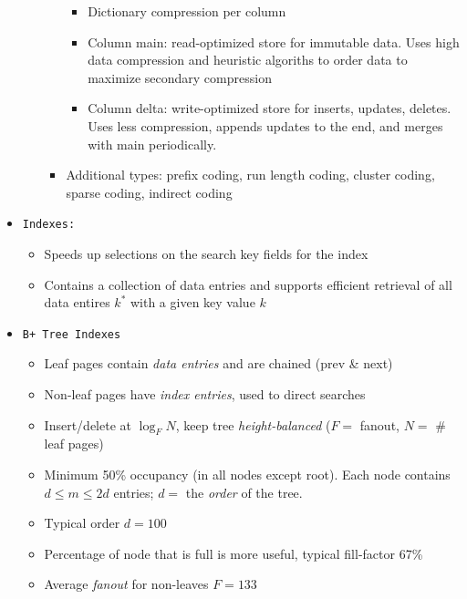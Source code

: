 \documentclass[landscape,8pt]{extarticle}
\newcommand{\code}{\lstinline}
\begin{document}
\begin{multicols}{4}
\begin{itemize}
\begin{itemize}
\begin{itemize}
\begin{itemize}
                                      \item Dictionary compression per column
                                      \item Column main: read-optimized store for immutable data. Uses high data compression and heuristic algoriths to order data to maximize secondary compression
                                      \item Column delta: write-optimized store for inserts, updates, deletes. Uses less compression, appends updates to the end, and merges with main periodically.
                                  \end{itemize}
                            \item Additional types: prefix coding, run length coding, cluster coding, sparse coding, indirect coding
                        \end{itemize}
              \end{itemize}
        \item \code{Indexes:}
              \begin{itemize}
                  \item Speeds up selections on the search key fields for the index
                  \item Contains a collection of data entries and supports efficient retrieval of all data entires $k^*$ with a given key value $k$
              \end{itemize}
        \item \code{B+ Tree Indexes}
              \begin{itemize}
                  \item Leaf pages contain \emph{data entries} and are chained (prev \& next)
                  \item Non-leaf pages have \emph{index entries}, used to direct searches
                  \item Insert/delete at $\log_F N$, keep tree \emph{height-balanced} ($F = $ fanout, $N = $ \# leaf pages)
                  \item Minimum 50\% occupancy (in all nodes except root). Each node contains $d \leq m \leq 2d$ entries; $d = $ the \emph{order} of the tree.
                  \item Typical order $d = 100$
                  \item Percentage of node that is full is more useful, typical fill-factor 67\%
                  \item Average \emph{fanout} for non-leaves $F = 133$

\end{itemize}
\end{itemize}
\end{multicols}
\end{document}
